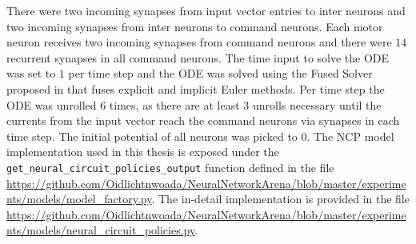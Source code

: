 \documentclass[draft,final]{vutinfth} %
\begin{document}
    There were two incoming synapses from input vector entries to inter neurons and two incoming synapses from inter neurons to command neurons.
    Each motor neuron receives two incoming synapses from command neurons and there were $14$ recurrent synapses in all command neurons.
    The time input to solve the ODE was set to $1$ per time step and the ODE was solved using the Fused Solver proposed in \cite{LTCNetworks} that fuses explicit and implicit Euler methods.
    Per time step the ODE was unrolled $6$ times, as there are at least $3$ unrolls necessary until the currents from the input vector reach the command neurons via synapses in each time step.
    The initial potential of all neurons was picked to $0$.
    The NCP model implementation used in this thesis is exposed under the \texttt{get\_neural\_circuit\_policies\_output} function defined in the file \url{https://github.com/Oidlichtnwoada/NeuralNetworkArena/blob/master/experiments/models/model_factory.py}.
    The in-detail implementation is provided in the file \url{https://github.com/Oidlichtnwoada/NeuralNetworkArena/blob/master/experiments/models/neural_circuit_policies.py}.
\end{document}
